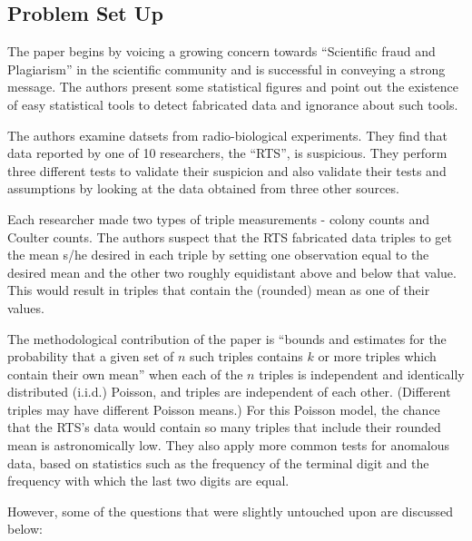 \documentclass{article}
\begin{document}
\subsection{Problem Set Up}\label{problem-set-up}

The paper begins by voicing a growing concern towards ``Scientific fraud
and Plagiarism'' in the scientific community and is successful in
conveying a strong message.
The authors present some statistical figures and point out the existence of easy statistical tools to detect fabricated data and ignorance about such tools.

The authors examine datsets from radio-biological experiments. They find that data reported by one of 10 researchers, the ``RTS'', is suspicious.
They perform three different tests to validate their suspicion and also validate their tests and assumptions by looking at the data obtained from three other sources.

Each researcher made two types of triple measurements - colony counts and Coulter counts.
The authors suspect that the RTS fabricated data triples to get the mean s/he desired in each triple by setting one observation equal to the desired mean and the other two roughly equidistant above and below that value.
This would result in triples that contain the (rounded) mean as one of their values.

The methodological contribution of the paper is “bounds and estimates for the probability that a given set of $n$ such triples contains $k$ or more triples which contain their own mean” when each of the $n$ triples is independent and identically distributed (i.i.d.) Poisson, and triples are independent of each other.
(Different triples may have different Poisson means.)
For this Poisson model, the chance that the RTS's data would contain so many triples that include their rounded mean is astronomically low.
They also apply more common tests for anomalous data, based on statistics such as the frequency of the terminal digit and the frequency with which the last two digits are equal.

However, some of the questions that were slightly untouched upon are discussed below:
\end{document}
